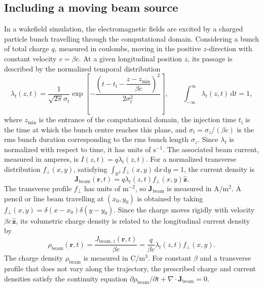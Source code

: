 \subsection{Including a moving beam source}
\label{sec:moving_beam_source}

In a wakefield simulation, the electromagnetic fields are excited by a charged particle bunch travelling through the computational domain. Considering a bunch of total charge $q$, measured in coulombs, moving in the positive $z$-direction with constant velocity $v=\beta c$. At a given longitudinal position $z$, its passage is described by the normalized temporal distribution
%
\begin{equation}
\lambda_t(z,t)
=
\frac{1}{\sqrt{2\pi}\sigma_t}
\exp\left[
-\frac{
\left(
t-t_{\mathrm{i}}-\dfrac{z-z_{\mathrm{min}}}{\beta c}
\right)^2
}{ 2\sigma_t^2 }
\right],
\qquad
\int_{-\infty}^{\infty}\lambda_t(z,t)\,\mathrm{d}t=1,
\label{eq:gaussian_bunch_temporal_profile}
\end{equation}
%
where $z_{\mathrm{min}}$ is the entrance of the computational domain, the injection time $t_{\mathrm{i}}$ is the time at which the bunch centre reaches this plane, and $\sigma_t=\sigma_z/(\beta c)$ is the rms bunch duration corresponding to the rms bunch length $\sigma_z$. Since $\lambda_t$ is normalized with respect to time, it has units of $\mathrm{s}^{-1}$. The associated beam current, measured in amperes, is $I(z,t)=q\lambda_t(z,t)$. For a normalized transverse distribution $f_\perp(x,y)$, satisfying $\int_{\mathbb{R}^2}f_\perp(x,y)\,\mathrm{d}x\,\mathrm{d}y=1$, the current density is
%
\begin{equation}
\mathbf{J}_{\mathrm{beam}}(\mathbf{r},t)
= q\lambda_t(z,t)f_\perp(x,y)\widehat{\mathbf{z}}.
\label{eq:continuous_beam_current}
\end{equation}
%
The transverse profile $f_\perp$ has units of $\mathrm{m}^{-2}$, so $\mathbf{J}_{\mathrm{beam}}$ is measured in $\mathrm{A/m^2}$. A pencil or line beam travelling at $(x_0,y_0)$ is obtained by taking $f_\perp(x,y)=\delta(x-x_0)\delta(y-y_0)$. Since the charge moves rigidly with velocity $\beta c\,\widehat{\mathbf{z}}$, its volumetric charge density is related to the longitudinal current density by
%
\begin{equation}
\rho_{\mathrm{beam}}(\mathbf{r},t)
=
\frac{J_{\mathrm{beam},z}(\mathbf{r},t)}{\beta c}
=
\frac{q}{\beta c}
\lambda_t(z,t)f_\perp(x,y).
\label{eq:continuous_beam_charge}
\end{equation}
%
The charge density $\rho_{\mathrm{beam}}$ is measured in $\mathrm{C/m^3}$. For constant $\beta$ and a transverse profile that does not vary along the trajectory, the prescribed charge and current densities satisfy the continuity equation $\partial\rho_{\mathrm{beam}}/\partial t +\nabla\cdot\mathbf{J}_{\mathrm{beam}}=0$.

